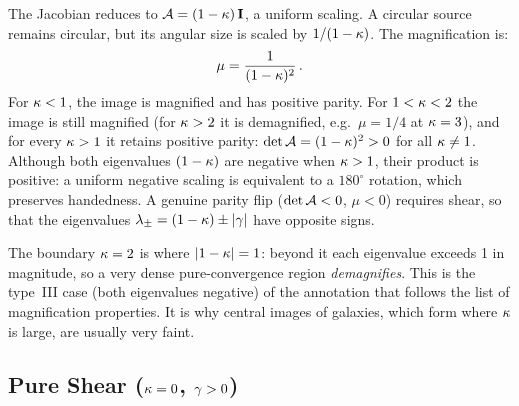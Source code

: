 The Jacobian reduces to $\mathcal{A} = (1 - \kappa)\,\mathbf{I}$, a
uniform scaling.  A circular source remains circular, but its angular
size is scaled by $1/(1 - \kappa)$.  The magnification is:
\begin{equation}
    \mu = \frac{1}{(1 - \kappa)^2} \,.
    \label{eq:mu_pure_convergence}
\end{equation}
For $\kappa < 1$, the image is magnified and has positive parity.
For $1 < \kappa < 2$ the image is still magnified (for $\kappa > 2$ it is
demagnified, e.g.\ $\mu = 1/4$ at $\kappa = 3$), and for every $\kappa > 1$
it retains positive parity: $\det\mathcal{A} = (1-\kappa)^2 > 0$ for all
$\kappa \neq 1$.  Although both eigenvalues $(1-\kappa)$ are
negative when $\kappa > 1$, their product is positive: a uniform
negative scaling is equivalent to a $180^\circ$ rotation, which
preserves handedness.  A genuine parity flip ($\det\mathcal{A} < 0$,
$\mu < 0$) requires shear, so that the eigenvalues
$\lambda_\pm = (1-\kappa) \pm |\gamma|$ have opposite signs.
\begin{annotation}
The boundary $\kappa = 2$ is where $|1-\kappa| = 1$: beyond it each eigenvalue
exceeds 1 in magnitude, so a very dense pure-convergence region
\emph{demagnifies}. This is the type~III case (both eigenvalues negative) of
the annotation that follows the list of magnification properties. It is why central images of galaxies, which form where
$\kappa$ is large, are usually very faint.
\end{annotation}

\subsection{Pure Shear ($\kappa = 0$, $\gamma > 0$)}

